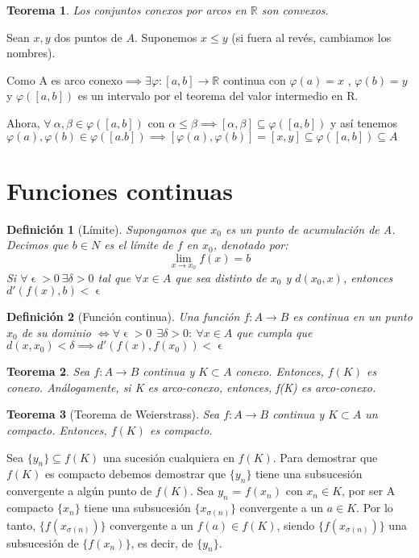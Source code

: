 \documentclass[11pt, a4paper]{article}
\makeatletter
\let\epsilon\upvarepsilon
\renewenvironment{proof}[1][\proofname] {\vspace{-15pt}\par\pushQED{\qed}\normalfont\topsep6\p@\@plus6\p@\relax\trivlist\item[\hskip\labelsep\it#1\@addpunct{.}]\ignorespaces}{\popQED\endtrivlist\@endpefalse}
\newcommand{\R}{\mathbb{R}}
\theoremstyle{theorem-style}
\newtheorem*{nth}{Teorema}
\theoremstyle{definition-style}
\newtheorem*{ndef}{Definición}
\theoremstyle{remark-style}
\theoremstyle{example-style}
\makeatother
\begin{document}
\begin{nth}
	Los conjuntos conexos por arcos en $\mathbb{R}$ son convexos.
\end{nth}
\begin{proof}
Sean $x,y$ dos puntos de $A$. Suponemos $x \leq y$ (si fuera al revés, cambiamos los nombres).

Como A es arco conexo$\implies \exists \varphi:[a,b]\to \R$ continua con $\varphi(a) = x$	, $\varphi(b) = y$ y $\varphi([a,b])$ es un intervalo por el teorema del valor intermedio en R.

Ahora, $\forall \ \alpha, \beta \in \varphi([a,b])$ con $\alpha \leq \beta \implies [\alpha,\beta ]  \subseteq \varphi([a,b]) $ y así tenemos $\varphi(a), \varphi(b) \in \varphi([a.b]) \implies [\varphi(a),\varphi(b)] = [x,y] \subseteq \varphi([a,b])\subseteq A$
\end{proof}



\section{Funciones continuas}

\begin{ndef}[Límite]
	Supongamos que $x_0$ es un punto de acumulación de A. Decimos que $b\in N$ es el límite de $f$ en $x_0$, denotado por:
	\[
	\lim_{x\to x_0}f(x) = b
	\]
	Si $\forall\epsilon > 0  \ \exists \delta > 0 $ tal que $\forall x \in A$ que sea distinto de $x_0$ y $d(x_0,x)$, entonces $d'(f(x),b) < \epsilon$ 
\end{ndef}

\begin{ndef}[Función continua]
	Una función $f:A \to B$ es continua en un punto $x_0$ de su dominio $\iff \forall \epsilon > 0 \ \ \exists \delta > 0 : \ \forall x \in A$ que cumpla que $d(x,x_0)< \delta \implies d'(f(x),f(x_0)) < \epsilon$
\end{ndef}

\begin{nth}
	Sea $f:A \to B$ continua y $K \subset A$ conexo. Entonces, $f(K)$ es conexo. Análogamente, si K es arco-conexo, entonces, f(K) es arco-conexo.
\end{nth}

\begin{nth}[Teorema de Weierstrass]
Sea $f:A \to B$ continua y $K\subset A$ un compacto. Entonces, $f(K)$ es compacto.	
\end{nth}
\begin{proof}
	Sea $\{y_n\}\subseteq f(K)$ una sucesión cualquiera en $f(K)$. Para demostrar que $f(K)$ es compacto debemos demostrar que $\{y_n\}$ tiene una subsucesión convergente a algún punto de $f(K)$. Sea $y_n$ = $f(x_n)$ con $x_n \in K$, por ser A compacto $\{x_n\}$ tiene una subsucesión $\{x_{\sigma(n)}\}$ convergente a un $a \in K$. Por lo tanto, $\{f(x_{\sigma(n)})\}$ convergente a un $f(a) \in f(K)$, siendo $\{f(x_{\sigma(n)})\}$ una subsucesión de $\{f(x_{n})\}$, es decir, de $\{y_n\}$.

\end{proof}
\end{document}
